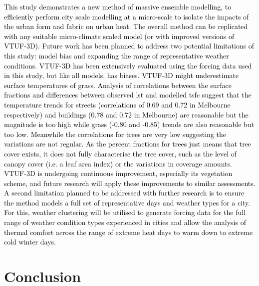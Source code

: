 \documentclass[final,3p,times,authoryear]{elsarticle}
\newcommand{\add}[1]{\textcolor{black}{#1}}
\begin{document}
\add{This study demonstrates a new method of massive ensemble modelling, to efficiently perform city scale modelling at a micro-scale to isolate the impacts of the urban form and fabric on urban heat. The overall method can be replicated with any suitable micro-climate scaled model (or with improved versions of VTUF-3D). Future work has been planned to address two potential limitations of this study: model bias and expanding the range of representative weather conditions. VTUF-3D has been extensively evaluated using the forcing data used in this study, but like all models, has biases. VTUF-3D might underestimate surface temperatures of grass. Analysis of correlations between the surface fractions and differences between observed \gls{lst} and modelled \gls{tsfc} suggest that the temperature trends for streets (correlations of 0.69 and 0.72 in Melbourne respectively) and buildings (0.78 and 0.72 in Melbourne) are reasonable but the magnitude is too high while grass (-0.80 and -0.85) trends are also reasonable but too low. Meanwhile the correlations for trees are very low suggesting the variations are not regular. As the percent fractions for trees just means that tree cover exists, it does not fully characterise the tree cover, such as the level of canopy cover (i.e. a leaf area index) or the variations in coverage amounts. VTUF-3D is undergoing continuous improvement, especially its vegetation scheme, and future research will apply these improvements to similar assessments. A second limitation planned to be addressed with further research is to ensure the method models a full set of representative days and weather types for a city. For this, weather clustering \citep{Shobha2017,Acero2019,nazarian2019outdoor} will be utilised to generate forcing data for the full range of weather condition types experienced in cities and allow the analysis of thermal comfort across the range of extreme heat days to warm down to extreme cold winter days.}


\section{Conclusion}\label{sec:conclusion}
\end{document}
